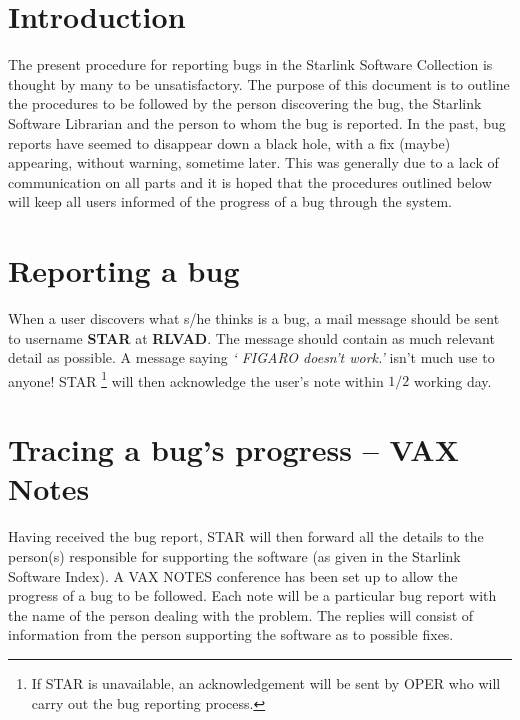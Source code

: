 \documentclass[twoside,11pt]{article}
\newcommand{\stardocinitials}  {SGP}
\newcommand{\stardocnumber}    {1.1}
\newcommand{\stardocname}{\stardocinitials /\stardocnumber}
\newenvironment{latexonly}{}{}
\newcommand{\latexonlytoc}[0]{\tableofcontents}
\begin{document}

\section{Introduction}
The present procedure for reporting bugs in the Starlink Software Collection is
thought by many to be unsatisfactory. The purpose of this document is to outline
the procedures to be followed by the person discovering the bug, the Starlink 
Software Librarian and the person to whom the bug is reported. In the past,
bug reports have seemed to disappear down a black hole, with a fix (maybe)
appearing, without warning, sometime later. This was generally due to a lack of 
communication on all parts and it is hoped that the procedures outlined below
will keep all users informed of the progress of a bug through the system.

\section{Reporting a bug}
When a user discovers what s/he thinks is a bug, a mail message should be
sent to username {\bf STAR} at {\bf RLVAD}. The message should contain as much
relevant detail as possible. A message saying {\it ` FIGARO doesn't work.'}
isn't much use to anyone! STAR \footnote[1]{If STAR is unavailable, an
acknowledgement will be sent by OPER who will carry out the bug reporting
process.} will then acknowledge the user's note within $1/2$ working day.

\section{Tracing a bug's progress -- VAX Notes}
Having received the bug report, STAR will then forward all the details to the
person(s) responsible for supporting the software (as given in the Starlink
Software Index). A VAX NOTES conference has been set up to allow the
progress of a bug to be followed. Each note will be a particular 
bug report
with the name of the person dealing with the problem. The replies will consist
of information from the person supporting the software as to possible fixes.
\end{document}
